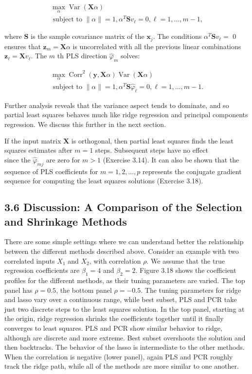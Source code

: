 \documentclass[10pt]{article}
\begin{document}
\begin{gather*}
\max _{\alpha} \operatorname{Var}(\mathbf{X} \alpha)  \tag{3.63}\\
\text { subject to }\|\alpha\|=1, \alpha^{T} \mathbf{S} v_{\ell}=0, \ell=1, \ldots, m-1,
\end{gather*}


where $\mathbf{S}$ is the sample covariance matrix of the $\mathbf{x}_{j}$. The conditions $\alpha^{T} \mathbf{S} v_{\ell}=$ 0 ensures that $\mathbf{z}_{m}=\mathbf{X} \alpha$ is uncorrelated with all the previous linear combinations $\mathbf{z}_{\ell}=\mathbf{X} v_{\ell}$. The $m$ th PLS direction $\hat{\varphi}_{m}$ solves:


\begin{gather*}
\max _{\alpha} \operatorname{Corr}^{2}(\mathbf{y}, \mathbf{X} \alpha) \operatorname{Var}(\mathbf{X} \alpha)  \tag{3.64}\\
\text { subject to }\|\alpha\|=1, \alpha^{T} \mathbf{S} \hat{\varphi}_{\ell}=0, \ell=1, \ldots, m-1 .
\end{gather*}


Further analysis reveals that the variance aspect tends to dominate, and so partial least squares behaves much like ridge regression and principal components regression. We discuss this further in the next section.

If the input matrix $\mathbf{X}$ is orthogonal, then partial least squares finds the least squares estimates after $m=1$ steps. Subsequent steps have no effect\\
since the $\hat{\varphi}_{m j}$ are zero for $m>1$ (Exercise 3.14). It can also be shown that the sequence of PLS coefficients for $m=1,2, \ldots, p$ represents the conjugate gradient sequence for computing the least squares solutions (Exercise 3.18).

\subsection*{3.6 Discussion: A Comparison of the Selection and Shrinkage Methods}
There are some simple settings where we can understand better the relationship between the different methods described above. Consider an example with two correlated inputs $X_{1}$ and $X_{2}$, with correlation $\rho$. We assume that the true regression coefficients are $\beta_{1}=4$ and $\beta_{2}=2$. Figure 3.18 shows the coefficient profiles for the different methods, as their tuning parameters are varied. The top panel has $\rho=0.5$, the bottom panel $\rho=-0.5$. The tuning parameters for ridge and lasso vary over a continuous range, while best subset, PLS and PCR take just two discrete steps to the least squares solution. In the top panel, starting at the origin, ridge regression shrinks the coefficients together until it finally converges to least squares. PLS and PCR show similar behavior to ridge, although are discrete and more extreme. Best subset overshoots the solution and then backtracks. The behavior of the lasso is intermediate to the other methods. When the correlation is negative (lower panel), again PLS and PCR roughly track the ridge path, while all of the methods are more similar to one another.
\end{document}
